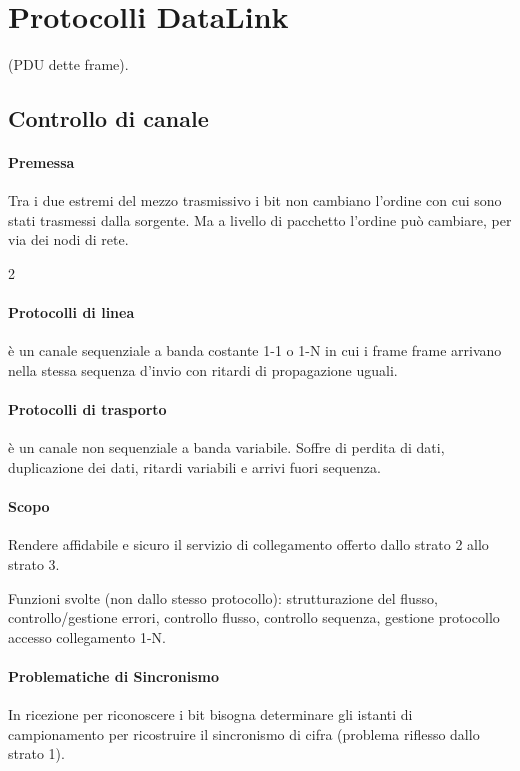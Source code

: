 \section{Protocolli DataLink}
(PDU dette frame).
\subsection{Controllo di canale}
\paragraph{Premessa} Tra i due estremi del mezzo trasmissivo i bit non cambiano l'ordine con cui sono stati trasmessi dalla sorgente. Ma a livello di pacchetto l'ordine può cambiare, per via dei nodi di rete.

\begin{paracol}{2}
	\paragraph{Protocolli di linea} è un canale sequenziale a banda costante 1-1 o 1-N in cui i frame frame arrivano nella stessa sequenza d'invio con ritardi di propagazione uguali.
	\switchcolumn
	\paragraph{Protocolli di trasporto} è un canale non sequenziale a banda variabile. Soffre di perdita di dati, duplicazione dei dati, ritardi variabili e arrivi fuori sequenza.
\end{paracol}

\paragraph{Scopo} Rendere affidabile e sicuro il servizio di collegamento offerto dallo strato 2 allo strato 3.

Funzioni svolte (non dallo stesso protocollo): strutturazione del flusso, controllo/gestione errori, controllo flusso, controllo sequenza, gestione protocollo accesso collegamento 1-N.

\paragraph{Problematiche di Sincronismo} In ricezione per riconoscere i bit bisogna determinare gli istanti di campionamento per ricostruire il sincronismo di cifra (problema riflesso dallo strato 1).


